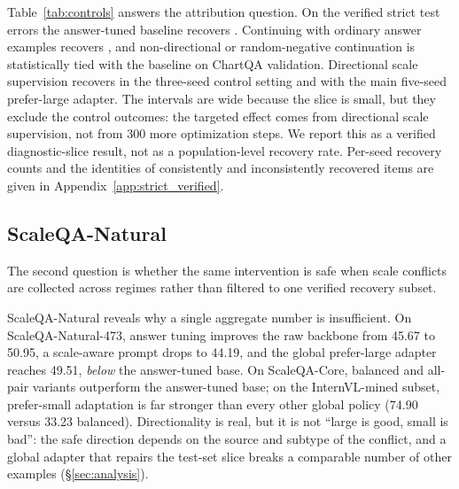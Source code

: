\begin{table}[h]
\centering
\small
\resizebox{\linewidth}{!}{}
\caption{Compute-matched controls. Every row continues the same answer-tuned adapter for the same number of steps; only the continuation data differs. Recovery is reported as counts over the  blind-verified strict test errors with Wilson 95\% intervals.}
\label{tab:controls}
\end{table}

Table~\ref{tab:controls} answers the attribution question. On the verified strict test errors the answer-tuned baseline recovers . Continuing with ordinary answer examples recovers , and non-directional or random-negative continuation is statistically tied with the baseline on ChartQA validation. Directional scale supervision recovers  in the three-seed control setting and  with the main five-seed prefer-large adapter. The intervals are wide because the slice is small, but they exclude the control outcomes: the targeted effect comes from directional scale supervision, not from 300 more optimization steps. We report this as a verified diagnostic-slice result, not as a population-level recovery rate. Per-seed recovery counts and the identities of consistently and inconsistently recovered items are given in Appendix~\ref{app:strict_verified}.

\subsection{ScaleQA-Natural}

The second question is whether the same intervention is safe when scale conflicts are collected across regimes rather than filtered to one verified recovery subset.

\begin{table}[h]
\centering
\small
\resizebox{\textwidth}{!}{}
\caption{ScaleQA-Natural diagnostic results. The first row is the image-evaluable ScaleQA-Natural-473 subset; ScaleQA-Core and InternVL-mined report five-seed pair-mode means. Large/Small denote prefer-large/prefer-small adapters.}
\label{tab:scaleqa_results}
\end{table}

ScaleQA-Natural reveals why a single aggregate number is insufficient. On ScaleQA-Natural-473, answer tuning improves the raw backbone from 45.67 to 50.95, a scale-aware prompt drops to 44.19, and the global prefer-large adapter reaches 49.51, \emph{below} the answer-tuned base. On ScaleQA-Core, balanced and all-pair variants outperform the answer-tuned base; on the InternVL-mined subset, prefer-small adaptation is far stronger than every other global policy (74.90 versus 33.23 balanced). Directionality is real, but it is not ``large is good, small is bad'': the safe direction depends on the source and subtype of the conflict, and a global adapter that repairs the test-set slice breaks a comparable number of other examples (\S\ref{sec:analysis}).

